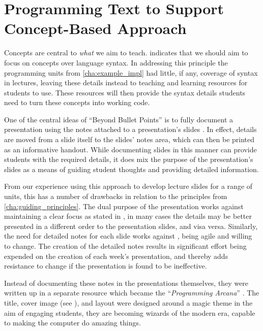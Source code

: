 \clearpage
\section{Programming Text to Support Concept-Based Approach} %
\label{sec:arcana}

Concepts are central to \emph{what} we aim to teach.  indicates that we should aim to focus on concepts over language syntax. In addressing this principle the programming units from \cref{cha:example_impl} had little, if any, coverage of syntax in lectures, leaving these details instead to teaching and learning resources for students to use. These resources will then provide the syntax details students need to turn these concepts into working code.

One of the central ideas of ``Beyond Bullet Points'' is to fully document a presentation using the notes attached to a presentation's slides \cite{Atkinson:2007}. In effect, details are moved from a slide itself to the slides' notes area, which can then be printed as an informative handout. While documenting slides in this manner can provide students with the required details, it does mix the purpose of the presentation's slides as a means of guiding student thoughts and providing detailed information.

From our experience using this approach to develop lecture slides for a range of units, this has a number of drawbacks in relation to the principles from \cref{cha:guiding_principles}. The dual purpose of the presentation works against maintaining a clear focus as stated in , in many cases the details may be better presented in a different order to the presentation slides, and visa versa. Similarly, the need for detailed notes for each slide works against , being agile and willing to change. The creation of the detailed notes results in significant effort being expended on the creation of each week's presentation, and thereby adds resistance to change if the presentation is found to be ineffective. 

Instead of documenting these notes in the presentations themselves, they were written up in a separate resource which became the ``\emph{Programming Arcana}'' \cite{Cain:2013arcana}. The title, cover image (see ), and layout were designed around a magic theme in the aim of engaging students, they are becoming wizards of the modern era, capable to making the computer do amazing things.

